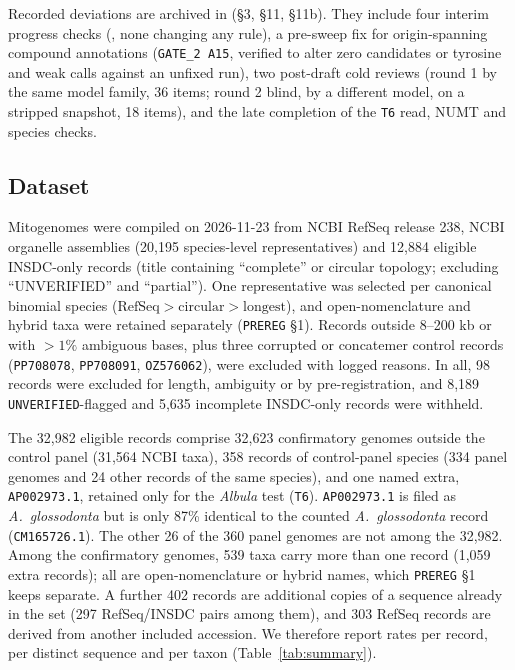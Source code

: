 \documentclass[11pt, a4paper]{article}
\begin{document}
Recorded deviations are archived in  (\S 3, \S 11, \S 11b). They include four interim progress checks (, none changing any rule), a pre-sweep fix for origin-spanning compound annotations (\texttt{GATE\_2 A15}, verified to alter zero candidates or tyrosine and weak calls against an unfixed run), two post-draft cold reviews (round 1 by the same model family, 36 items; round 2 blind, by a different model, on a stripped snapshot, 18 items), and the late completion of the \texttt{T6} read, NUMT and species checks.

\subsection{Dataset}
Mitogenomes were compiled on 2026-11-23 from NCBI RefSeq release 238, NCBI organelle assemblies (20,195 species-level representatives) and 12,884 eligible INSDC-only records (title containing ``complete'' or circular topology; excluding ``UNVERIFIED'' and ``partial''). One representative was selected per canonical binomial species ($\mathrm{RefSeq} > \mathrm{circular} > \mathrm{longest}$), and open-nomenclature and hybrid taxa were retained separately (\texttt{PREREG} \S 1). Records outside 8--200 kb or with $>1\%$ ambiguous bases, plus three corrupted or concatemer control records (\texttt{PP708078}, \texttt{PP708091}, \texttt{OZ576062}), were excluded with logged reasons. In all, 98 records were excluded for length, ambiguity or by pre-registration, and 8,189 \texttt{UNVERIFIED}-flagged and 5,635 incomplete INSDC-only records were withheld.

The 32,982 eligible records comprise 32,623 confirmatory genomes outside the control panel (31,564 NCBI taxa), 358 records of control-panel species (334 panel genomes and 24 other records of the same species), and one named extra, \texttt{AP002973.1}, retained only for the \textit{Albula} test (\texttt{T6}). \texttt{AP002973.1} is filed as \textit{A.\ glossodonta} but is only 87\% identical to the counted \textit{A.\ glossodonta} record (\texttt{CM165726.1}). The other 26 of the 360 panel genomes are not among the 32,982. Among the confirmatory genomes, 539 taxa carry more than one record (1,059 extra records); all are open-nomenclature or hybrid names, which \texttt{PREREG} \S 1 keeps separate. A further 402 records are additional copies of a sequence already in the set (297 RefSeq/INSDC pairs among them), and 303 RefSeq records are derived from another included accession. We therefore report rates per record, per distinct sequence and per taxon (Table~\ref{tab:summary}).
\end{document}
